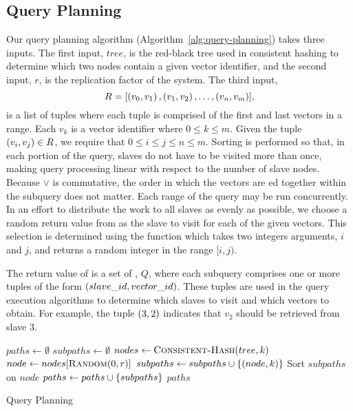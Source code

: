 \subsection{Query Planning}
Our query planning algorithm (Algorithm~\ref{alg:query-planning}) takes three
inputs. The first input, \(tree\), is the red-black tree used in consistent
hashing to determine which two nodes contain a given vector identifier, and the
second input, \(r\), is the replication factor of the system.
The third input,
\[R = [\left(v_0, v_1\right), \left(v_1, v_2\right), \ldots, \left(v_n, v_m\right)],\]
is a list of tuples where each tuple is comprised of the first and last vectors
in a range. Each \(v_k\) is a vector identifier where \(0 \leq k \leq m\).
Given the tuple \(\left(v_i, v_j\right) \in R\), we require that
\(0 \leq i \leq j \leq n \leq m\). Sorting is performed so that, in each
portion of the query, slaves do not have to be visited more than once, making
query processing linear with respect to the number of slave nodes. Because
\(\lor\) is commutative, the order in which the vectors are ed
together within the subquery does not matter. Each range of the query may be
run concurrently. In an effort to distribute the work to all slaves as evenly
as possible, we choose a random return value from 
as the slave to visit for each of the given vectors. This selection is
determined using the  function which takes two integers
arguments, \(i\) and \(j\), and returns a random integer in the range
\([i, j)\).
\par
The return value of  is a set of ,
\(Q\), where each subquery comprises one or more tuples of the form
\(\left(slave\_id,vector\_id\right)\). These tuples are used in the query execution
algorithms to determine which slaves to visit and which vectors to obtain. For
example, the tuple \(\left(3, 2\right)\) indicates that \(v_2\) should be retrieved
from slave 3.
%
\begin{algorithm}
    \begin{algorithmic}
            \State $paths \gets \emptyset$
                \State $subpaths \gets \emptyset$
                    \State $nodes \gets \Call{Consistent-Hash}{tree, k}$
                    \State $node \gets nodes[\Call{Random}{0, r}]$
                    \State $subpaths \gets subpaths \cup \left\{(node, k)\right\}$
                \EndFor
                \State Sort $subpaths$ on $node$
                \State $paths \gets paths \cup \left\{subpaths\right\}$
            \EndFor
            \Return $paths$
        \EndProcedure
    \end{algorithmic}
    \caption{Query Planning}
    \label{alg:query-planning}
\end{algorithm}
%
